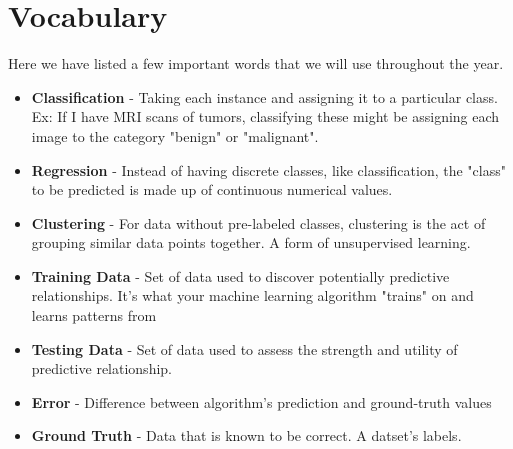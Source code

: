 \documentclass{article}
\begin{document}
\section{Vocabulary}

Here we have listed a few important words that we will use throughout the year.

\begin{itemize}
    \item \textbf{Classification} - Taking each instance and assigning it to a particular class. Ex: If I have MRI scans of tumors, classifying these might be assigning each image to the category "benign" or "malignant".
    \item \textbf{Regression} - Instead of having discrete classes, like classification, the "class" to be predicted is made up of continuous numerical values.
    \item \textbf{Clustering} - For data without pre-labeled classes, clustering is the act of grouping similar data points together. A form of unsupervised learning.
    \item \textbf{Training Data} - Set of data used to discover potentially predictive relationships. It's what your machine learning algorithm "trains" on and learns patterns from
    \item \textbf{Testing Data} - Set of data used to assess the strength and utility of predictive relationship.
    \item \textbf{Error} - Difference between algorithm's prediction and ground-truth values
    \item \textbf{Ground Truth} - Data that is known to be correct. A datset's labels.
\end{itemize}
\end{document}
